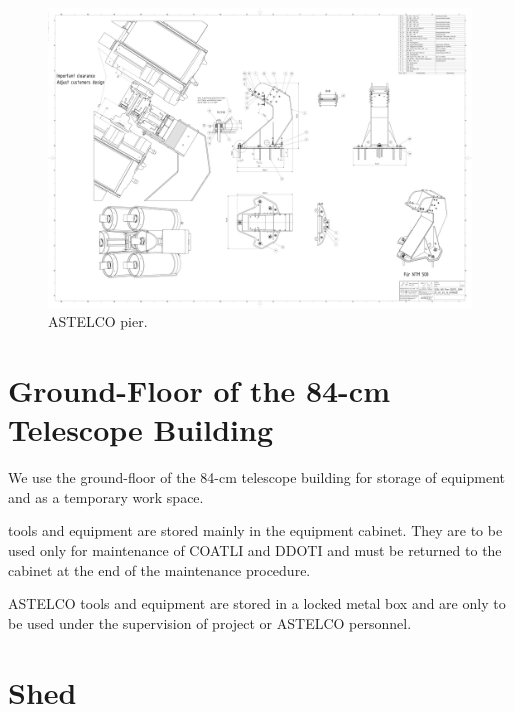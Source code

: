 \begin{figure}
\begin{center}
\includegraphics[height=0.95\linewidth,angle=90]{figures/buildings-ddoti-astelco-pier-drawing-3234}
\end{center}
\caption{{\projectname} ASTELCO pier.}
\label{figure:buildings-drawing-astelco-pier}
\end{figure}

\fi

\section{Ground-Floor of the 84-cm Telescope Building}

We use the ground-floor of the 84-cm telescope building for storage of equipment and as a temporary work space.

{\projectname} tools and equipment are stored mainly in the equipment cabinet. They are to be used only for maintenance of COATLI and DDOTI and must be returned to the cabinet at the end of the maintenance procedure.

ASTELCO tools and equipment are stored in a locked metal box and are only to be used under the supervision of project or ASTELCO personnel.

\section{Shed}
\label{section:shed}
\label{section:shed-key}

